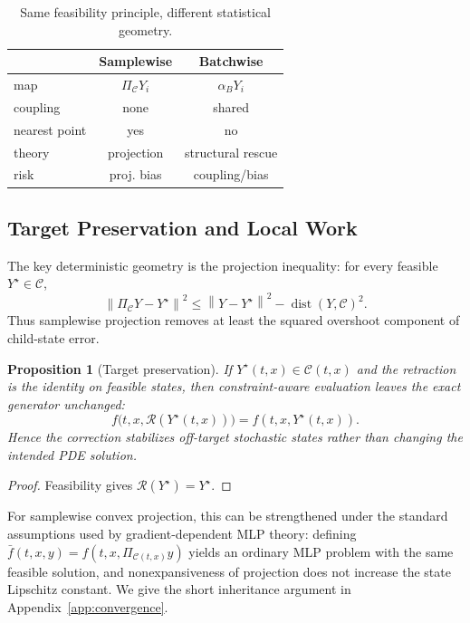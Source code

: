 \documentclass{article}
\newtheorem{proposition}[theorem]{Proposition}
\newcommand{\norm}[1]{\left\lVert #1\right\rVert}
\newcommand{\dist}{\operatorname{dist}}
\begin{document}
\begin{table}[t]
\caption{Same feasibility principle, different statistical geometry.}
\label{tab:methods}
\centering\small
\begin{tabular}{@{}lcc@{}}
\toprule
& Samplewise & Batchwise\\
\midrule
map & $\Pi_{\mathcal C}Y_i$ & $\alpha_BY_i$\\
coupling & none & shared\\
nearest point & yes & no\\
theory & projection & structural rescue\\
risk & proj. bias & coupling/bias\\
\bottomrule
\end{tabular}
\end{table}

\subsection{Target Preservation and Local Work}
The key deterministic geometry is the projection inequality: for every feasible $Y^\star\in\mathcal C$,
\begin{equation}
\norm{\Pi_{\mathcal C}Y-Y^\star}^2
\le \norm{Y-Y^\star}^2-\dist(Y,\mathcal C)^2.
\label{eq:pyth}
\end{equation}
Thus samplewise projection removes at least the squared overshoot component of child-state error.

\begin{proposition}[Target preservation]
\label{prop:target}
If $Y^\star(t,x)\in\mathcal C(t,x)$ and the retraction is the identity on feasible states, then constraint-aware evaluation leaves the exact generator unchanged:
\[
f\bigl(t,x,\mathcal R(Y^\star(t,x))\bigr)=f(t,x,Y^\star(t,x)).
\]
Hence the correction stabilizes off-target stochastic states rather than changing the intended PDE solution.
\end{proposition}
\begin{proof}
Feasibility gives $\mathcal R(Y^\star)=Y^\star$.
\end{proof}

For samplewise convex projection, this can be strengthened under the standard assumptions used by gradient-dependent MLP theory: defining $\bar f(t,x,y)=f(t,x,\Pi_{\mathcal C(t,x)}y)$ yields an ordinary MLP problem with the same feasible solution, and nonexpansiveness of projection does not increase the state Lipschitz constant. We give the short inheritance argument in Appendix~\ref{app:convergence}.
\end{document}
